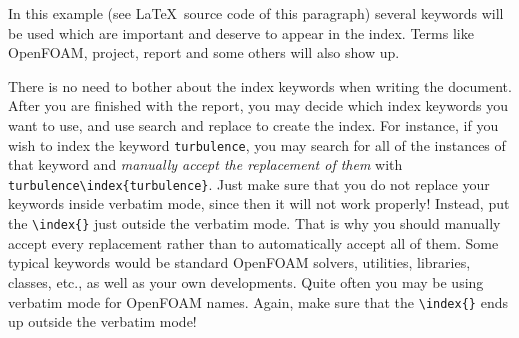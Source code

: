 In this example (see \LaTeX~source code of this paragraph) several keywords will be used which are important and deserve to appear in the index. Terms like OpenFOAM, project, report and some others will also show up.


There is no need to bother about the index keywords when writing the document. After you are finished with the report, you may decide which index keywords you want to use, and use search and replace to create the index. For instance, if you wish to index the keyword \verb|turbulence|, you may search for all of the instances of that keyword and \emph{manually accept the replacement of them} with \verb|turbulence\index{turbulence}|. Just make sure that you do not replace your keywords inside verbatim mode, since then it will not work properly! Instead, put the \verb|\index{}| just outside the verbatim mode. That is why you should manually accept every replacement rather than to automatically accept all of them. Some typical keywords would be standard OpenFOAM solvers, utilities, libraries, classes, etc., as well as your own developments. Quite often you may be using verbatim mode for OpenFOAM names. Again, make sure that the \verb|\index{}| ends up outside the verbatim mode!